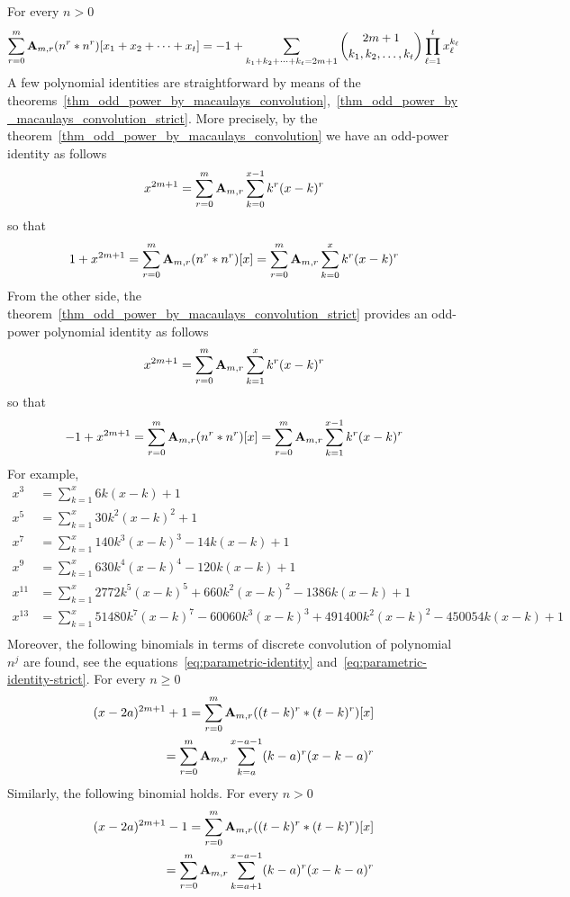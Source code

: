 For every $n>0$
\begin{align*}
    \sum_{r=0}^{m} \coeffA{m}{r} \convPower{n}{r}{\multifoldSum{t}} =
    -1 + \sum_{\multifoldSum[k]{t}=2m+1} \binom{2m+1}{k_1, k_2,\ldots, k_t} \prod_{\ell=1}^{t} x_\ell^{k_\ell}
\end{align*}
A few polynomial identities are straightforward by means of
the theorems~\eqref{thm_odd_power_by_macaulays_convolution},~\eqref{thm_odd_power_by_macaulays_convolution_strict}.
More precisely, by the theorem~\eqref{thm_odd_power_by_macaulays_convolution} we have an odd-power identity as follows
\begin{equation*}
    x^{2m+1} = \sum_{r=0}^{m} \coeffA{m}{r} \sum_{k=0}^{x-1} k^r (x-k)^r
\end{equation*}
so that
\begin{align*}
    1 + x^{2m+1} = \sum_{r=0}^{m} \coeffA{m}{r} \convPower{n}{r}{x}
    = \sum_{r=0}^{m} \coeffA{m}{r} \sum_{k=0}^{x} k^r (x-k)^r
\end{align*}
From the other side, the theorem~\eqref{thm_odd_power_by_macaulays_convolution_strict} provides an odd-power
polynomial identity as follows
\begin{equation*}
    x^{2m+1} = \sum_{r=0}^{m} \coeffA{m}{r} \sum_{k=1}^{x} k^r (x-k)^r
\end{equation*}
so that
\begin{equation*}
    -1 + x^{2m+1} = \sum_{r=0}^{m} \coeffA{m}{r} \convPower{n}{r}{x}
    = \sum_{r=0}^{m} \coeffA{m}{r} \sum_{k=1}^{x-1} k^r (x-k)^r
\end{equation*}
For example,
\begin{align*}
    x^3 &= \sum_{k=1}^{x} 6k (x-k) + 1 \\
    x^5 &= \sum_{k=1}^{x} 30k^2 (x-k)^2 + 1 \\
    x^7 &= \sum_{k=1}^{x} 140 k^3 (x-k)^3 - 14k(x-k) + 1 \\
    x^9 &= \sum_{k=1}^{x} 630 k^4(x-k)^4 - 120k(x-k) + 1 \\
    x^{11} &= \sum_{k=1}^{x} 2772 k^5 (x-k)^5 + 660 k^2(x-k)^2 - 1386k(x-k) + 1 \\
    x^{13} &= \sum_{k=1}^{x} 51480 k^7 (x-k)^7 - 60060 k^3 (x-k)^3 + 491400 k^2 (x-k)^{2} - 450054 k (x-k) + 1 \\
\end{align*}
Moreover, the following binomials in terms of discrete convolution of polynomial $n^j$ are found,
see the equations~\eqref{eq:parametric-identity} and~\eqref{eq:parametric-identity-strict}.
For every $n \geq 0$
\begin{equation*}
    \begin{split}
    (x-2a)
        ^{2m+1} + 1 = \sum_{r=0}^{m} \coeffA{m}{r} ((t-k)^r \ast (t-k)^r)[x] \\
        = \sum_{r=0}^{m} \coeffA{m}{r} \sum_{k=a}^{x-a-1} (k-a)^r (x-k-a)^r
    \end{split}
\end{equation*}
Similarly, the following binomial holds.
For every $n > 0$
\begin{equation*}
    \begin{split}
    (x-2a)
        ^{2m+1} - 1 = \sum_{r=0}^{m} \coeffA{m}{r} ((t-k)^r \ast (t-k)^r)[x] \\
        = \sum_{r=0}^{m} \coeffA{m}{r} \sum_{k=a+1}^{x-a-1} (k-a)^r (x-k-a)^r
    \end{split}
\end{equation*}
